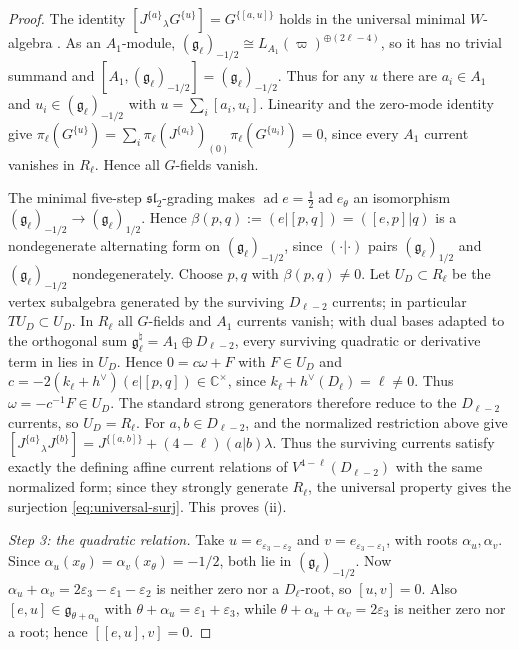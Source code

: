 \documentclass[11pt]{article}
\newcommand{\g}{\mathfrak g}
\begin{document}
\begin{proof}
The identity
$[J^{\{a\}}{}_{\lambda}G^{\{u\}}]=G^{\{[a,u]\}}$
holds in the universal minimal $W$-algebra
\cite[Theorem~2.1(c), equation~(2.6)]{AKMPPStructural}.
As an $A_1$-module, $(\g_\ell)_{-1/2}\cong
L_{A_1}(\varpi)^{\oplus(2\ell-4)}$, so it has no trivial summand and
$[A_1,(\g_\ell)_{-1/2}]=(\g_\ell)_{-1/2}$.  Thus for any
$u$ there are $a_i\in A_1$ and $u_i\in(\g_\ell)_{-1/2}$ with
$u=\sum_i[a_i,u_i]$.  Linearity and the zero-mode identity give
$\pi_\ell(G^{\{u\}})=\sum_i\pi_\ell(J^{\{a_i\}})_{(0)}
\pi_\ell(G^{\{u_i\}})=0$,
since every $A_1$ current vanishes in $R_\ell$.  Hence all $G$-fields vanish.

The minimal five-step $\mathfrak{sl}_2$-grading makes
$\operatorname{ad}e=\tfrac12\operatorname{ad}e_\theta$ an isomorphism
$(\g_\ell)_{-1/2}\to(\g_\ell)_{1/2}$.  Hence
$\beta(p,q):=(e|[p,q])=([e,p]|q)$ is a nondegenerate alternating form on
$(\g_\ell)_{-1/2}$, since $(\cdot|\cdot)$ pairs
$(\g_\ell)_{1/2}$ and $(\g_\ell)_{-1/2}$ nondegenerately.  Choose
$p,q$ with $\beta(p,q)\ne0$.  Let $U_D\subset R_\ell$ be the vertex
subalgebra generated by the surviving $D_{\ell-2}$ currents; in particular
$TU_D\subset U_D$.  In $R_\ell$ all $G$-fields and $A_1$ currents vanish;
with dual bases adapted to the orthogonal sum
$\g_\ell^\natural=A_1\oplus D_{\ell-2}$, every surviving quadratic or
derivative term in \cite[(1.1)]{AKMPPStructural} lies in $U_D$.  Hence
$0=c\omega+F$ with $F\in U_D$ and
$c=-2(k_\ell+h^\vee)(e|[p,q])\in\mathbb C^\times$, since
$k_\ell+h^\vee(D_\ell)=\ell\ne0$.  Thus $\omega=-c^{-1}F\in U_D$.
The standard strong generators therefore reduce to
the $D_{\ell-2}$ currents, so $U_D=R_\ell$.  For $a,b\in D_{\ell-2}$,
\cite[Theorem~2.1(c)]{AKMPPStructural} and the normalized restriction above give
$[J^{\{a\}}{}_{\lambda}J^{\{b\}}]=J^{\{[a,b]\}}+(4-\ell)(a|b)\lambda$.
Thus the surviving currents satisfy exactly the defining affine current
relations of $V^{4-\ell}(D_{\ell-2})$ with the same normalized form; since
they strongly generate $R_\ell$, the universal property gives the surjection
\eqref{eq:universal-surj}.  This proves \textup{(ii)}.

\smallskip
\noindent\emph{Step 3: the quadratic relation.}
Take $u=e_{\varepsilon_3-\varepsilon_2}$ and
$v=e_{\varepsilon_3-\varepsilon_1}$, with roots $\alpha_u,\alpha_v$.
Since $\alpha_u(x_\theta)=\alpha_v(x_\theta)=-1/2$, both lie in
$(\g_\ell)_{-1/2}$.  Now
$\alpha_u+\alpha_v=2\varepsilon_3-\varepsilon_1-\varepsilon_2$ is neither
zero nor a $D_\ell$-root, so $[u,v]=0$.  Also
$[e,u]\in\g_{\theta+\alpha_u}$ with
$\theta+\alpha_u=\varepsilon_1+\varepsilon_3$, while
$\theta+\alpha_u+\alpha_v=2\varepsilon_3$ is neither zero nor a root;
hence $[[e,u],v]=0$.


\end{proof}
\end{document}
